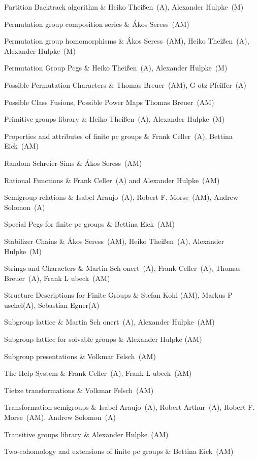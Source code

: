 Partition Backtrack algorithm &
Heiko Thei{\ss}en~(A), Alexander Hulpke~(M)

Permutation group composition series &
{\'A}kos Seress~(AM)

Permutation group homomorphisms &
{\'A}kos Seress~(AM), Heiko Thei{\ss}en~(A), Alexander Hulpke~(M)

Permutation Group Pcgs &
Heiko Thei{\ss}en~(A), Alexander Hulpke~(M)

Possible Permutation Characters &
Thomas Breuer~(AM), G{ o}tz Pfeiffer~(A)

Possible Class Fusions, Possible Power Maps
Thomas Breuer~(AM)

Primitive groups library &
Heiko Thei{\ss}en~(A), Alexander Hulpke~(M)

Properties and attributes of finite pc groups &
Frank Celler~(A), Bettina Eick~(AM)

Random Schreier-Sims &
{\'A}kos Seress~(AM)

Rational Functions &
Frank Celler~(A) and Alexander Hulpke~(AM)

Semigroup relations &
Isabel Araujo~(A), Robert F. Morse~(AM), Andrew Solomon~(A)

Special Pcgs for finite pc groups &
Bettina Eick~(AM)

Stabilizer Chains &
{\'A}kos Seress~(AM), Heiko Thei{\ss}en~(A), Alexander Hulpke~(M)

Strings and Characters & 
Martin Sch{ o}nert~(A), Frank Celler~(A), Thomas Breuer~(A), 
Frank L{ u}beck~(AM)

Structure Descriptions for Finite Groups &
Stefan Kohl (AM), Markus P{ u}schel(A), Sebastian Egner(A)

Subgroup lattice &
Martin Sch{ o}nert~(A), Alexander Hulpke~(AM)

Subgroup lattice for solvable groups &
Alexander Hulpke (AM)

Subgroup presentations &
Volkmar Felsch~(AM)

The Help System &
Frank Celler~(A), Frank L{ u}beck~(AM)

Tietze transformations &
Volkmar Felsch~(AM)

Transformation semigroups &
Isabel Araujo~(A), Robert Arthur~(A), Robert F. Morse~(AM), 
Andrew Solomon~(A)

Transitive groups library &
Alexander Hulpke~(AM)

Two-cohomology and extensions of finite pc groups &
Bettina Eick~(AM)

